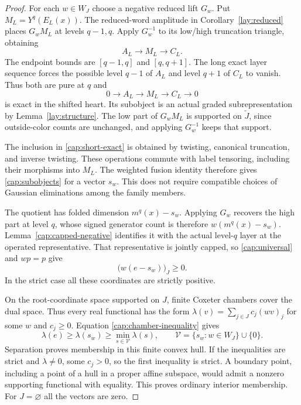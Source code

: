 \begin{proof}
For each $w\in W_J$ choose a negative reduced lift $G_w$.  Put
$M_L=Y^q(E_L(x))$.  The reduced-word amplitude in
Corollary~\ref{lay:reduced} places $G_wM_L$ at levels $q-1,q$.
Apply $G_w^{-1}$ to its low/high truncation triangle, obtaining
\[
 A_L\longrightarrow M_L\longrightarrow C_L.
\]
The endpoint bounds are $[q-1,q]$ and $[q,q+1]$.  The long exact
layer sequence forces the possible level $q-1$ of $A_L$ and level
$q+1$ of $C_L$ to vanish.  Thus both are pure at $q$ and
\begin{equation}
 0\longrightarrow A_L\longrightarrow M_L\longrightarrow C_L
       \longrightarrow0
 \label{cap:short-exact}
\end{equation}
is exact in the shifted heart.  Its subobject is an actual graded
subrepresentation by Lemma~\ref{lay:structure}.  The low part of
$G_wM_L$ is supported on $\widetilde J$, since outside-color counts
are unchanged, and applying $G_w^{-1}$ keeps that support.

The inclusion in \eqref{cap:short-exact} is obtained by twisting,
canonical truncation, and inverse twisting.  These operations commute
with label tensoring, including their morphisms into $M_L$.  The
weighted fusion identity therefore gives \eqref{cap:subobjects} for
a vector $s_w$.  This does not require compatible choices of Gaussian
eliminations among the family members.

The quotient has folded dimension $m^q(x)-s_w$.  Applying $G_w$
recovers the high part at level $q$, whose signed generator count is
therefore $w(m^q(x)-s_w)$.  Lemma~\ref{cap:capped-negative} identifies
it with the actual level-$q$ layer at the operated representative.
That representative is jointly capped, so \eqref{cap:universal}
and $wp=p$ give
\begin{equation}
 \bigl(w(e-s_w)\bigr)_J\ge0.
 \label{cap:chamber-inequality}
\end{equation}
In the strict case all these coordinates are strictly positive.

On the root-coordinate space supported on $J$, finite Coxeter
chambers cover the dual space.  Thus every real functional has the
form $\lambda(v)=\sum_{j\in J}c_j(wv)_j$ for some $w$ and $c_j\ge0$.
Equation \eqref{cap:chamber-inequality} gives
\[
 \lambda(e)\ge\lambda(s_w)
       \ge\min_{s\in\mathcal V}\lambda(s),
 \qquad \mathcal V=\{s_w:w\in W_J\}\cup\{0\}.
\]
Separation proves membership in this finite convex hull.  If the
inequalities are strict and $\lambda\ne0$, some $c_j>0$, so the first
inequality is strict.  A boundary point, including a point of a hull
in a proper affine subspace, would admit a nonzero supporting
functional with equality.  This proves ordinary interior membership.
For $J=\varnothing$ all the vectors are zero.
\end{proof}

